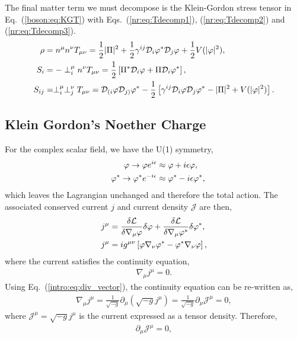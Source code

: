 The final matter term we must decompose is the Klein-Gordon stress tensor in Eq.~(\ref{boson:eq:KGT}) with Eqs.~(\ref{nr:eq:Tdecomp1}), (\ref{nr:eq:Tdecomp2}) and (\ref{nr:eq:Tdecomp3}). \begin{align} \rho &=n^\mu n^\nu T_{\mu\nu} = \frac{1}{2}|\Pi|^2 + \frac{1}{2}\gamma^{ij}\mathcal{D}_i \varphi^* \mathcal{D}_j \varphi +\frac{1}{2}V(|\varphi|^2)
,\\ S_i &= -\perp^\mu_i n^\nu T_{\mu\nu} =  \frac{1}{2}\left[\Pi^* \mathcal{D}_i \varphi  +  \Pi\mathcal{D}_i \varphi^* \right]
,\\ S_{ij} &= \perp^\mu_i \perp^\nu_j T_{\mu\nu} = \mathcal{D}_{(i}\varphi\mathcal{D}_{j)}\varphi^* - \frac{1}{2}\left[ \gamma^{ij}\mathcal{D}_i\varphi\mathcal{D}_j\varphi^* - |\Pi|^2 + V(|\varphi|^2)\right].\end{align}

\subsection{Klein Gordon's Noether Charge}
For the complex scalar field, we have the U(1) symmetry,
\begin{align}
\varphi \rightarrow \varphi e^{i\epsilon} &\approx \varphi + i\epsilon \varphi , \\ 
\quad\varphi^* \rightarrow \varphi^* e^{-i\epsilon}  &\approx \varphi^* - i\epsilon \varphi^*,
\end{align}
which leaves the Lagrangian unchanged and therefore the total action. The associated conserved current $j$ and current density $\mathcal{J}$ are then,
\begin{align} 
j^\mu &= \frac{\delta \mathcal{L}}{\delta \nabla_\mu\varphi}\delta \varphi + \frac{\delta \mathcal{L}}{\delta \nabla_\mu \varphi^*}\delta \varphi^*,\\
 j^\mu &=  ig^{\mu\nu}\left[\varphi\nabla_\nu\varphi^* - \varphi^*\nabla_\nu\varphi\right],
  \end{align}
  where the current satisfies the continuity equation,
\begin{align}
\nabla_\mu j^\mu = 0.
 \end{align}
Using Eq.~(\ref{intro:eq:div_vector}), the continuity equation can be re-written as,
\begin{align}
\nabla_\mu j^\mu = \frac{1}{\sqrt{-g}} \partial_\mu \left( \sqrt{-g} j^\mu \right) = \frac{1}{\sqrt{-g}} \partial_\mu \mathcal{J}^\mu = 0,
 \end{align}
 where $\mathcal{J}^\mu = \sqrt{-g}j^\mu$ is the current expressed as a tensor density. Therefore,
\begin{align}
\partial_\mu \mathcal{J}^\mu =0,\label{boson:eq:divJ}
 \end{align}
